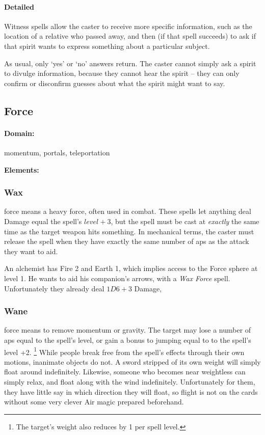 \begin{multicols}{2}
\paragraph{Detailed}
Witness spells allow the caster to receive more specific information, such as the location of a relative who passed away, and then (if that spell succeeds) to ask if that spirit wants to express something about a particular subject.

As usual, only `yes' or `no' answers return.
The caster cannot simply ask a spirit to divulge information, because they cannot hear the spirit -- they can only confirm or disconfirm guesses about what the spirit might want to say.

\subsection{Force}
\paragraph{Domain:}
momentum, portals, teleportation

\textbf{Elements:}

\subsubsection{Wax}
force means a heavy force, often used in combat.
These spells let anything deal Damage equal the spell's $level + 3$, but the spell must be cast at \emph{exactly} the same time as the target weapon hits something.
In mechanical terms, the caster must release the spell when they have exactly the same number of \glspl{ap} as the attack they want to aid.

\begin{exampletext}
  An alchemist has Fire 2 and Earth 1, which implies access to the Force sphere at level 1.
  He wants to aid his companion's arrows, with a \textit{Wax Force} spell.
  Unfortunately they already deal $1D6+3$ Damage, 
\end{exampletext}

\subsubsection{Wane}
force means to remove momentum or gravity.
The target may lose a number of \glspl{ap} equal to the spell's level, or gain a bonus to jumping equal to to the spell's level +2.%
\footnote{The target's \gls{weight} also reduces by 1 per spell level.}
While people break free from the spell's effects through their own motions, inanimate objects do not.
A sword stripped of its own weight will simply float around indefinitely.
Likewise, someone who becomes near weightless can simply relax, and float along with the wind indefinitely.
Unfortunately for them, they have little say in which direction they will float, so flight is not on the cards without some very clever Air magic prepared beforehand.


\end{multicols}
